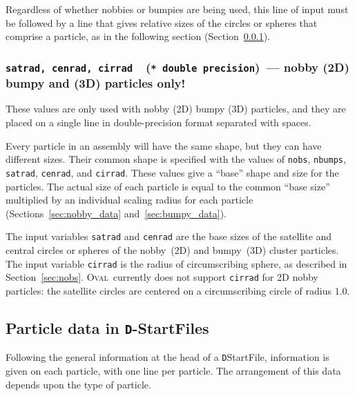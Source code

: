 \documentclass[letterpaper,11pt]{article}
\newcommand{\Oval}{\textsc{Oval}}
\newcommand{\Var}[2]{\texttt{#1}\ \  (\texttt{#2})}
\begin{document}
\par
Regardless of whether nobbies or bumpies are being used, 
this line of input must be followed by a line
that gives relative sizes of the circles or spheres that comprise
a particle, as in the
following section (Section~\ref{sec:satrad}).

\subsubsection[\texttt{satrad}, \texttt{cenrad}, \texttt{cirrad}]
              {\Var{satrad, cenrad, cirrad}{* double precision}\ --- nobby 
              (2D) bumpy and (3D) particles only!}\label{sec:satrad}
These values are only used with nobby (2D) bumpy (3D) particles, and
they are placed on a single line in double-precision format separated with
spaces.
\par
Every particle in an assembly will have the same shape, but they
can have different sizes.  
Their common shape is specified with the values of \texttt{nobs},
\texttt{nbumps}, \texttt{satrad}, \texttt{cenrad}, and \texttt{cirrad}.
These values give a ``base'' shape and size for the particles.
The actual size of each particle is equal to the common ``base size''
multiplied by an individual scaling radius for each particle
(Sections~\ref{sec:nobby_data} and~\ref{sec:bumpy_data}).
\par
The input variables \texttt{satrad} and \texttt{cenrad} are the
base sizes of the satellite and central circles or spheres of the 
nobby~(2D) and bumpy~(3D) cluster particles.
The input variable \texttt{cirrad} is the radius of circumscribing
sphere, as described in Section~\ref{sec:nobs}.
\Oval\ currently does not support \texttt{cirrad} for 2D nobby particles:
the satellite circles are centered on a circumscribing circle
of radius $1.0$.
%
\subsection{Particle data in \texttt{D}-\textsf{StartFiles}}%
\label{sec:StartFile2}
Following the general information at the head of a 
\texttt{D}\textsf{StartFile}, information is given on each particle,
with one line per particle.  
The arrangement of this data depends upon the type
of particle.
\end{document}
